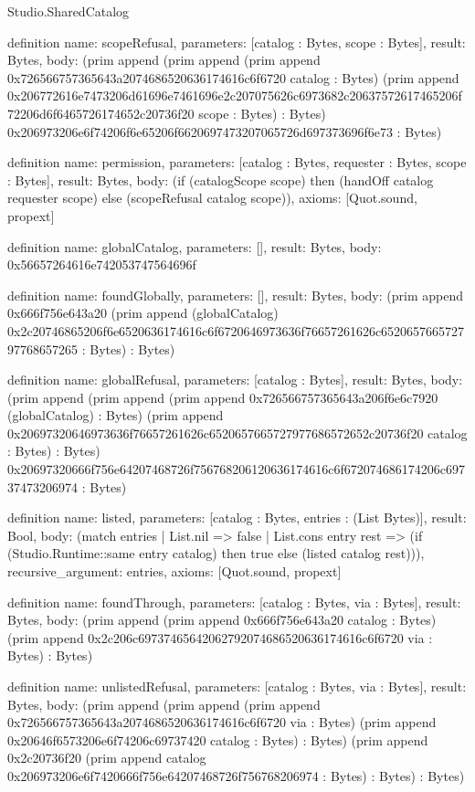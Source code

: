 \begin{lexlean}{Studio.SharedCatalog}
\begin{semanticmodule}
definition{
  name: scopeRefusal,
  parameters: [catalog : Bytes, scope : Bytes],
  result: Bytes,
  body: (prim append (prim append (prim append 0x726566757365643a2074686520636174616c6f6720 catalog : Bytes) (prim append 0x206772616e7473206d61696e7461696e2c207075626c6973682c20637572617465206f72206d6f6465726174652c20736f20 scope : Bytes) : Bytes) 0x206973206e6f74206f6e65206f6620697473207065726d697373696f6e73 : Bytes)
}

definition{
  name: permission,
  parameters: [catalog : Bytes, requester : Bytes, scope : Bytes],
  result: Bytes,
  body: (if (catalogScope scope) then (handOff catalog requester scope) else (scopeRefusal catalog scope)),
  axioms: [Quot.sound, propext]
}

definition{
  name: globalCatalog,
  parameters: [],
  result: Bytes,
  body: 0x56657264616e742053747564696f
}

definition{
  name: foundGlobally,
  parameters: [],
  result: Bytes,
  body: (prim append 0x666f756e643a20 (prim append (globalCatalog) 0x2c20746865206f6e6520636174616c6f6720646973636f76657261626c652065766572797768657265 : Bytes) : Bytes)
}

definition{
  name: globalRefusal,
  parameters: [catalog : Bytes],
  result: Bytes,
  body: (prim append (prim append (prim append 0x726566757365643a206f6e6c7920 (globalCatalog) : Bytes) (prim append 0x20697320646973636f76657261626c6520657665727977686572652c20736f20 catalog : Bytes) : Bytes) 0x20697320666f756e64207468726f756768206120636174616c6f672074686174206c69737473206974 : Bytes)
}

definition{
  name: listed,
  parameters: [catalog : Bytes, entries : (List Bytes)],
  result: Bool,
  body: (match entries
    | List.nil => false
    | List.cons entry rest => (if (Studio.Runtime::same entry catalog) then true else (listed catalog rest))),
  recursive_argument: entries,
  axioms: [Quot.sound, propext]
}

definition{
  name: foundThrough,
  parameters: [catalog : Bytes, via : Bytes],
  result: Bytes,
  body: (prim append (prim append 0x666f756e643a20 catalog : Bytes) (prim append 0x2c206c69737465642062792074686520636174616c6f6720 via : Bytes) : Bytes)
}

definition{
  name: unlistedRefusal,
  parameters: [catalog : Bytes, via : Bytes],
  result: Bytes,
  body: (prim append (prim append (prim append 0x726566757365643a2074686520636174616c6f6720 via : Bytes) (prim append 0x20646f6573206e6f74206c69737420 catalog : Bytes) : Bytes) (prim append 0x2c20736f20 (prim append catalog 0x206973206e6f7420666f756e64207468726f756768206974 : Bytes) : Bytes) : Bytes)
}


\end{semanticmodule}
\end{lexlean}

